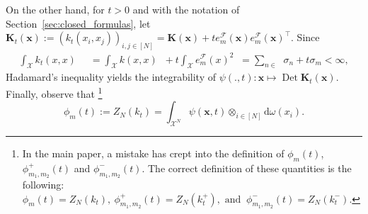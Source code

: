 \documentclass[twoside,11pt]{book}
\DeclareMathOperator{\Det}{Det}
\DeclareMathOperator{\Tran}{\intercal}
\DeclareMathOperator{\F}{\mathcal{F}}
\DeclareMathOperator{\X}{\mathcal{X}}
\DeclareMathOperator{\Mu}{\mathrm{d}\omega(x)}
\DeclareMathOperator{\Ns}{\mathbb{N}^{*}}
\begin{document}
On the other hand, for $t>0$ and with the notation of Section~\ref{sec:closed_formulas}, let $ \bm{K}_{t}(\bm{x}) := (k_{t}(x_{i},x_{j}))_{i,j \in [N]} = \bm{K}(\bm{x})+t e_{m}^{\mathcal{F}}(\bm{x})e_{m}^{\mathcal{F}}(\bm{x})^{\Tran}$.
Since
\begin{align}
\int_{\X} k_{t}(x,x) \Mu
& = \int_{\X} k(x,x) \Mu + t \int_{\X} e_{m}^{\F}(x)^{2} \Mu = \sum\limits_{n \in \Ns} \sigma_{n} + t \sigma_{m} < \infty,
\end{align}
Hadamard's inequality yields the integrability of
$
\psi(.,t): \bm{x} \mapsto \Det \bm{K}_{t}(\bm{x}).
$
Finally, observe that \footnote{In the main paper, a mistake has crept into the definition of $\phi_{m}(t)$, $\phi_{m_{1},m_{2}}^{+}(t)$ and $\phi_{m_{1},m_{2}}^{-}(t)$. The correct definition of these quantities is the following: $
\phi_{m}(t) = Z_{N}(k_{t}) , \: \phi_{m_{1},m_{2}}^{+}(t) = Z_{N}(k_{t}^{+}),  \text{ and }\: \phi_{m_{1},m_{2}}^{-}(t) = Z_{N}(k_{t}^{-}). $}
\begin{equation}
\phi_{m}(t) := Z_N(k_t) =  \int_{\X^{N}} \psi(\bm{x},t) \otimes_{i \in [N]} \mathrm{d}\omega(x_{i}).
\end{equation}
\end{document}

